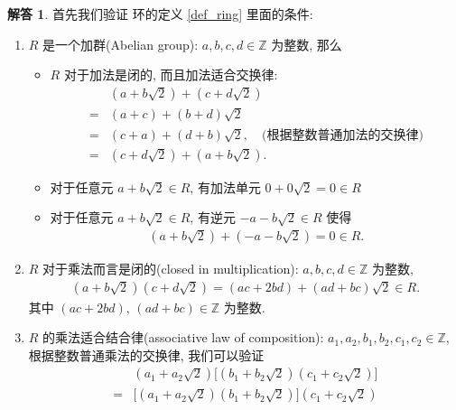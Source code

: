 \documentclass[utf8]{ctexbook}
\theoremstyle{definition}
\newtheorem*{soln}{解答}
\begin{document}
\begin{soln}
首先我们验证 环的定义 \ref{def_ring} 里面的条件:
\begin{enumerate}
\item{$R$ 是一个加群(Abelian group): $a,b,c,d \in \mathbb{Z}$ 为整数, 那么 
\begin{itemize}
\item{$R$ 对于加法是闭的, 而且加法适合交换律:
\begin{align*}
& (a+b \sqrt{2} ) + (c+ d \sqrt{2}) \\
=& (a + c) + (b + d ) \sqrt{2} \\
=& (c + a) + (d + b ) \sqrt{2}, \quad \mbox{(根据整数普通加法的交换律)} \\
=& (c+ d \sqrt{2}) + (a+b \sqrt{2} ) .
\end{align*}
}
\item{对于任意元 $a+b \sqrt{2}  \in R$, 有加法单元 $0 + 0 \sqrt{2} = 0 \in R$}
\item{对于任意元 $a+b \sqrt{2}  \in R$, 有逆元 $-a - b \sqrt{2} \in R$ 使得
\begin{align*}
(a + b \sqrt{2}) + (-a - b \sqrt{2} ) = 0 \in R .
\end{align*}
}
\end{itemize}
}
\item{$R$ 对于乘法而言是闭的(closed in multiplication): $a,b,c,d \in \mathbb{Z}$ 为整数, 
\begin{align*}
(a + b \sqrt{2}) (c + d \sqrt{2}) = (ac + 2bd) + (ad + bc) \sqrt{2} \in R.
\end{align*}
其中 $(ac + 2bd),\, (ad + bc) \in \mathbb{Z}$ 为整数.
}
\item{$R$ 的乘法适合结合律(associative law of composition): $a_1, a_2, b_1, b_2, c_1, c_2 \in \mathbb{Z}$, 根据整数普通乘法的交换律, 我们可以验证
\begin{align*}
&(a_1 + a_2 \sqrt{2}) \big[ (b_1 + b_2 \sqrt{2})  (c_1 + c_2 \sqrt{2})  \big] \\
=& \big[ (a_1 + a_2 \sqrt{2}) (b_1 + b_2 \sqrt{2}) \big]  (c_1 + c_2 \sqrt{2})  
\end{align*}
}
\end{enumerate}


\end{soln}
\end{document}

